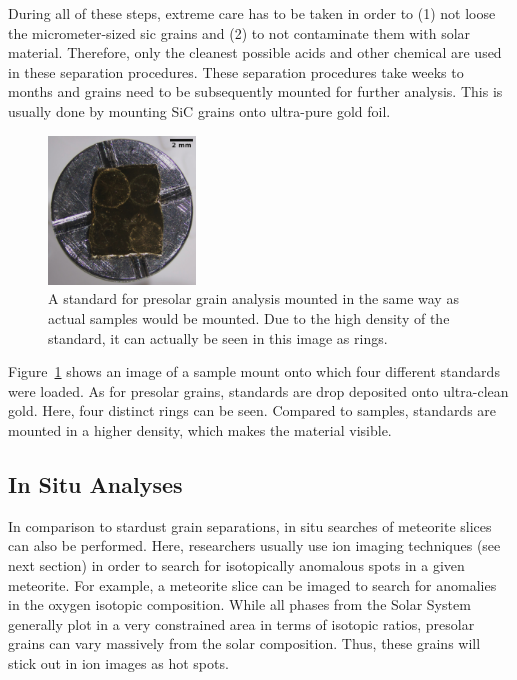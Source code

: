 During all of these steps, extreme care has to be taken in order to (1) not loose the micrometer-sized \ac{sic} grains and (2) to not contaminate them with solar material. Therefore, only the cleanest possible acids and other chemical are used in these separation procedures. These separation procedures take weeks to months and grains need to be subsequently mounted for further analysis. This is usually done by mounting SiC grains onto ultra-pure gold foil.
\begin{figure}[tb]
    \centering
    \includegraphics[width=0.35\textwidth]{graphics/stardust/standard_mount}
    \caption{A standard for presolar grain analysis mounted in the same way as actual samples would be mounted. Due to the high density of the standard, it can actually be seen in this image as rings.}
    \label{fig:stardust:sample_mount}
\end{figure}
Figure~\ref{fig:stardust:sample_mount} shows an image of a sample mount onto which four different standards were loaded. As for presolar grains, standards are drop deposited onto ultra-clean gold. Here, four distinct rings can be seen. Compared to samples, standards are mounted in a higher density, which makes the material visible.


\subsection{In Situ Analyses}

In comparison to stardust grain separations, in situ searches of meteorite slices can also be performed. Here, researchers usually use ion imaging techniques (see next section) in order to search for isotopically anomalous spots in a given meteorite. For example, a meteorite slice can be imaged to search for anomalies in the oxygen isotopic composition. While all phases from the Solar System generally plot in a very constrained area in terms of isotopic ratios, presolar grains can vary massively from the solar composition. Thus, these grains will stick out in ion images as hot spots.



